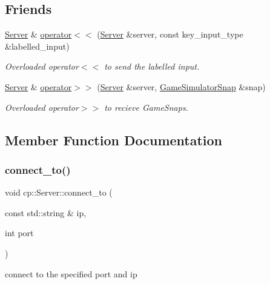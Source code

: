 \subsection*{Friends}
\begin{DoxyCompactItemize}
\item 
\hyperlink{classcp_1_1_server}{Server} \& \hyperlink{classcp_1_1_server_a996961461d4083fbb237bce454c42c3f}{operator$<$$<$} (\hyperlink{classcp_1_1_server}{Server} \&server, const key\+\_\+input\+\_\+type \&labelled\+\_\+input)
\begin{DoxyCompactList}\small\item\em Overloaded operator$<$$<$ to send the labelled input. \end{DoxyCompactList}\item 
\hyperlink{classcp_1_1_server}{Server} \& \hyperlink{classcp_1_1_server_a0be043cde5346b18f9fed76e2ae909b7}{operator$>$$>$} (\hyperlink{classcp_1_1_server}{Server} \&server, \hyperlink{classcp_1_1_game_simulator_snap}{Game\+Simulator\+Snap} \&snap)
\begin{DoxyCompactList}\small\item\em Overloaded operator$>$$>$ to recieve Game\+Snaps. \end{DoxyCompactList}\end{DoxyCompactItemize}


\subsection{Member Function Documentation}
\mbox{\label{classcp_1_1_server_ae83a84ed4d85c6e432d09013a48392c8}} 
\subsubsection{\texorpdfstring{connect\+\_\+to()}{connect\_to()}}
{\footnotesize\ttfamily void cp\+::\+Server\+::connect\+\_\+to (\begin{DoxyParamCaption}\item[{const std\+::string \&}]{ip,  }\item[{int}]{port }\end{DoxyParamCaption})\hspace{0.3cm}{\ttfamily [inline]}}



connect to the specified port and ip 


